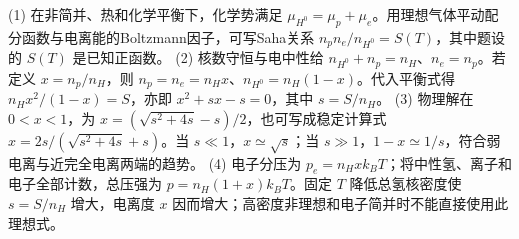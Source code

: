 (1) 在非简并、热和化学平衡下，化学势满足 \(\mu_{H^0}=\mu_p+\mu_e\)。用理想气体平动配分函数与电离能的Boltzmann因子，可写Saha关系 \(n_pn_e/n_{H^0}=S(T)\)，其中题设的 \(S(T)\) 是已知正函数。
(2) 核数守恒与电中性给 \(n_{H^0}+n_p=n_H\)、\(n_e=n_p\)。若定义 \(x=n_p/n_H\)，则 \(n_p=n_e=n_Hx\)、\(n_{H^0}=n_H(1-x)\)。代入平衡式得 \(n_Hx^2/(1-x)=S\)，亦即 \(x^2+sx-s=0\)，其中 \(s=S/n_H\)。
(3) 物理解在 \(0<x<1\)，为 \(x=(\sqrt{s^2+4s}-s)/2\)，也可写成稳定计算式 \(x=2s/(\sqrt{s^2+4s}+s)\)。当 \(s\ll1\)，\(x\simeq\sqrt s\)；当 \(s\gg1\)，\(1-x\simeq1/s\)，符合弱电离与近完全电离两端的趋势。
(4) 电子分压为 \(p_e=n_Hxk_BT\)；将中性氢、离子和电子全部计数，总压强为 \(p=n_H(1+x)k_BT\)。固定 \(T\) 降低总氢核密度使 \(s=S/n_H\) 增大，电离度 \(x\) 因而增大；高密度非理想和电子简并时不能直接使用此理想式。
